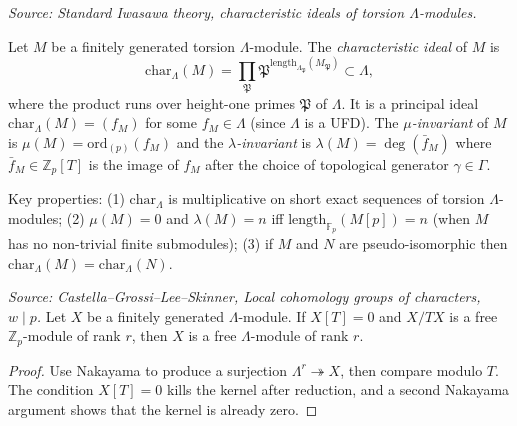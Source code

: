 \begin{definition}
  \label{def:char-ideal}
  \textit{Source: Standard Iwasawa theory, characteristic ideals of torsion \(\Lambda\)-modules.}

  Let \(M\) be a finitely generated torsion \(\Lambda\)-module. The \emph{characteristic ideal} of \(M\) is
  \[
    \mathrm{char}_\Lambda(M) = \prod_{\mathfrak{P}} \mathfrak{P}^{\mathrm{length}_{\Lambda_\mathfrak{P}}(M_\mathfrak{P})} \subset \Lambda,
  \]
  where the product runs over height-one primes \(\mathfrak{P}\) of \(\Lambda\). It is a principal ideal \(\mathrm{char}_\Lambda(M) = (f_M)\) for some \(f_M \in \Lambda\) (since \(\Lambda\) is a UFD). The \emph{\(\mu\)-invariant} of \(M\) is \(\mu(M) = \mathrm{ord}_{(p)}(f_M)\) and the \emph{\(\lambda\)-invariant} is \(\lambda(M) = \deg(\bar{f}_M)\) where \(\bar{f}_M \in \mathbb{Z}_p[T]\) is the image of \(f_M\) after the choice of topological generator \(\gamma \in \Gamma\).

  Key properties: (1) \(\mathrm{char}_\Lambda\) is multiplicative on short exact sequences of torsion \(\Lambda\)-modules; (2) \(\mu(M) = 0\) and \(\lambda(M) = n\) iff \(\mathrm{length}_{\mathbb{F}_p}(M[p]) = n\) (when \(M\) has no non-trivial finite submodules); (3) if \(M\) and \(N\) are pseudo-isomorphic then \(\mathrm{char}_\Lambda(M) = \mathrm{char}_\Lambda(N)\).
\end{definition}

\begin{lemma}
  \label{lem:commalg}
  \textit{Source: Castella--Grossi--Lee--Skinner, Local cohomology groups of characters, \(w\mid p\).}
  Let \(X\) be a finitely generated \(\Lambda\)-module. If \(X[T]=0\) and \(X/TX\) is a free \(\mathbb{Z}_p\)-module of rank \(r\), then \(X\) is a free \(\Lambda\)-module of rank \(r\).
\end{lemma}

\begin{proof}
Use Nakayama to produce a surjection \(\Lambda^r\twoheadrightarrow X\), then compare modulo \(T\). The condition \(X[T]=0\) kills the kernel after reduction, and a second Nakayama argument shows that the kernel is already zero.
\end{proof}

